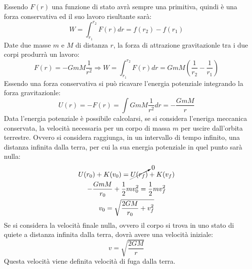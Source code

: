 \documentclass{article}
\numberwithin{equation}{subsection}
\begin{document}
Essendo $F(r)$ una funzione di stato avrà sempre una primitiva, quindi è una forza conservativa ed il suo lavoro risultante sarà:
\begin{equation*}
    W=\displaystyle\int_{r_1}^{r_2}F(r)dr=f(r_2)-f(r_1)
\end{equation*}
Date due masse $m$ e $M$ di distanza $r$, la forza di attrazione gravitazionle tra i due corpi produrrà un lavoro: 
\begin{equation}
    F(r)=-GmM\displaystyle\frac{1}{r^2}\Rightarrow W=\displaystyle\int_{r_1}^{r_2}F(r)dr=GmM\left(\frac{1}{r_2}-\frac{1}{r_1}\right)
\end{equation}
Essendo una forza conservativa si può ricavare l'energia potenziale integrando la forza gravitazionle:
\begin{equation}
    U(r)=-F(r)=\displaystyle\int GmM\frac{1}{r^2}dr=-\frac{GmM}{r}
\end{equation}
Data l'energia potenziale è possibile calcolarsi, se si considera l'eneriga meccanica conservata, la velocità necessaria per un corpo di 
massa $m$ per uscire dall'orbita terrestre. Ovvero si considera raggiunga, in un intervallo di tempo infinito, una distanza infinita dalla terra, per 
cui la sua energia potenziale in quel punto sarà nulla:
\begin{gather*}
    U(r_0)+K(v_0)=\cancelto{0}{U(r_f)}+K(v_f)\\
    -\displaystyle\frac{GmM}{r_0}+\frac{1}{2}mv_0^2=\frac{1}{2}mv_f^2\\
    v_0=\displaystyle\sqrt{\displaystyle\frac{2GM}{r_0}+v_f^2}
\end{gather*}
Se si considera la velocità finale nulla, ovvero il corpo si trova in uno stato di quiete a distanza infinita dalla terra, dovrà avere 
una velocità iniziale:
\begin{equation}
    v=\displaystyle\sqrt{\frac{2GM}{r}}
\end{equation}
Questa velocità viene definita velocità di fuga dalla terra. 
\end{document}
